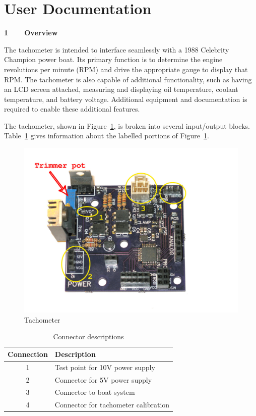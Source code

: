 \documentclass[11pt]{article}
\begin{document}
\newpage\clearpage
\section{User Documentation}
\label{app:user}



{\large\textbf{1~~~~Overview}}

The tachometer is intended to interface seamlessly with a 1988 Celebrity Champion power boat. Its primary function is to determine the engine revolutions per minute (RPM) and drive the appropriate gauge to display that RPM. The tachometer is also capable of additional functionality, such as having an LCD screen attached, measuring and displaying oil temperature, coolant temperature, and battery voltage. Additional equipment and documentation is required to enable these additional features.

The tachometer, shown in Figure~\ref{fig:mamad}, is broken into several input/output blocks. Table~\ref{tab:descd} gives information about the labelled portions of Figure~\ref{fig:mamad}.
\begin{figure}[H]
    \centering
    \includegraphics[width=.9\textwidth]{documents/mamaboard}
    \caption{Tachometer}
    \label{fig:mamad}
\end{figure}

\begin{table}[H]
\centering
\caption{Connector descriptions}
\label{tab:descd}
\begin{tabular}{@{}cl@{}}
\toprule
\textbf{Connection} & \textbf{Description} \\ \midrule
1 & Test point for 10V power supply \\
2 & Connector for 5V power supply \\
3 & Connector to boat system \\
4 & Connector for tachometer calibration \\ \bottomrule
\end{tabular}
\end{table}
\end{document}
